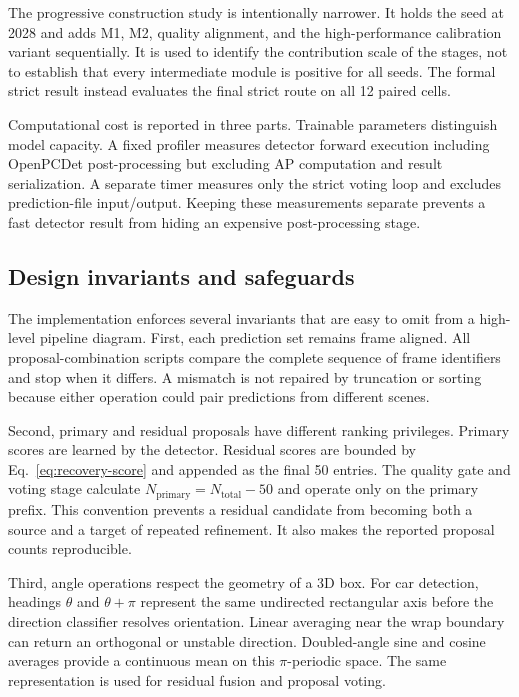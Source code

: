 \documentclass[final,5p,times]{elsarticle}
\begin{document}
The progressive construction study is intentionally narrower. It holds the
seed at 2028 and adds M1, M2, quality alignment, and the high-performance
calibration variant sequentially. It is used to identify the contribution
scale of the stages, not to establish that every intermediate module is
positive for all seeds. The formal strict result instead evaluates the final
strict route on all 12 paired cells.

Computational cost is reported in three parts. Trainable parameters distinguish
model capacity. A fixed profiler measures detector forward execution including
OpenPCDet post-processing but excluding AP computation and result
serialization. A separate timer measures only the strict voting loop and
excludes prediction-file input/output. Keeping these measurements separate
prevents a fast detector result from hiding an expensive post-processing
stage.

\subsection{Design invariants and safeguards}

The implementation enforces several invariants that are easy to omit from a
high-level pipeline diagram. First, each prediction set remains frame aligned.
All proposal-combination scripts compare the complete sequence of frame
identifiers and stop when it differs. A mismatch is not repaired by truncation
or sorting because either operation could pair predictions from different
scenes.

Second, primary and residual proposals have different ranking privileges.
Primary scores are learned by the detector. Residual scores are bounded by
Eq.~\eqref{eq:recovery-score} and appended as the final 50 entries. The
quality gate and voting stage calculate
$N_{\mathrm{primary}}=N_{\mathrm{total}}-50$ and operate only on the primary
prefix. This convention prevents a residual candidate from becoming both a
source and a target of repeated refinement. It also makes the reported
proposal counts reproducible.

Third, angle operations respect the geometry of a 3D box. For car detection,
headings $\theta$ and $\theta+\pi$ represent the same undirected rectangular
axis before the direction classifier resolves orientation. Linear averaging
near the wrap boundary can return an orthogonal or unstable direction.
Doubled-angle sine and cosine averages provide a continuous mean on this
$\pi$-periodic space. The same representation is used for residual fusion and
proposal voting.
\end{document}
